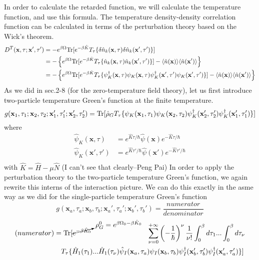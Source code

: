  In order to calculate the retarded function, we will calculate the temperature function, and use this formula.
 The temperature density-density correlation function can be calculated in terms of the perturbation theory based on the Wick's theorem.
\[
\begin{aligned}
D^T(\mathbf x,\tau;\mathbf x',\tau')&=-e^{\beta\Omega}\text{Tr}[e^{-\beta \hat K}T_\tau\{ \delta \hat n_k(\mathbf x ,\tau)\delta \hat n_k(\mathbf x' ,\tau') \}]\\
&=-\left\{e^{\beta\Omega}\text{Tr}[e^{-\beta \hat K}T_\tau\{ \hat n_k(\mathbf x ,\tau)\hat n_k(\mathbf x' ,\tau') \}] -\langle \hat n(\mathbf x)\rangle \langle \hat n (\mathbf x')\rangle \right\}\\
&=-\left\{e^{\beta\Omega}\text{Tr}[e^{-\beta \hat K}T_\tau\{ \psi_K^\dag(\mathbf x,\tau)\psi_K(\mathbf x,\tau) \psi_K^\dag(\mathbf x',\tau')\psi_K(\mathbf x',\tau') \}] -\langle \hat n(\mathbf x)\rangle \langle \hat n (\mathbf x')\rangle \right\}
\end{aligned}
\]
As we did in sec.2-8 (for the zero-temperature field theory), let us first introduce two-particle temperature Green's function at the finite temperature.
\begin{equation}
g(\mathbf x_1,\tau_1;\mathbf x_2,\tau_2;\mathbf x_1',\tau_1';\mathbf x_2',\tau_2')=\text{Tr} [\hat \rho_G T_\tau\{\psi_K(\mathbf x_1,\tau_1)\psi_K(\mathbf x_2,\tau_2)\psi_K^\dag(\mathbf x_2',\tau_2')\psi_K^\dag(\mathbf x_1',\tau_1')\}]
\end{equation}
where
\[
\begin{aligned}
\hat \psi_K(\mathbf x ,\tau)&=e^{\hat K\tau/\hbar}\hat \psi(\mathbf x)e^{-\hat K\tau/\hbar}\\
\hat \psi_K(\mathbf x' ,\tau')&=e^{\hat K\tau'/\hbar}\hat \psi(\mathbf x')e^{-\hat K\tau'/\hbar}\\
\end{aligned}
\]
with $\hat K=\hat H-\mu \hat N$ (I can't see that clearly--Peng Pai)
 In order to apply the perturbation theory to the two-particle temperature Green's function, we again rewrite this interns of the interaction picture.
 We can do this exactly in the asme way as we did for the single-particle temperature Green's function
\[
g(\mathbf x_a,\tau_a;\mathbf x_b,\tau_b;\mathbf x_a',\tau_a';\mathbf x_b',\tau_b')=\frac{numerator}{denominator}
\]
\[
\begin{aligned}
(numerator)&=\text{Tr} [ \cancelto{\rho^0_G=e^{\beta\Omega_0-\beta\hat K_0}}{e^{-\beta\hat K_0}}\qquad \qquad\qquad\qquad\sum_{\nu=0}^{+\infty}\left( -\frac{1}{\hbar}\right)^\nu \frac{1}{\nu!}\int_0^{\beta}d\tau_1 ... \int_0^{\beta}d\tau_\nu\\
 &\quad T_\tau\{ \hat H_1(\tau_1)...\hat H_1(\tau_\nu) \hat\psi_I(\mathbf x_a,\tau_a) \psi_I(\mathbf x_b,\tau_b) \psi_I^\dag(\mathbf x_b',\tau_b') \psi_I^\dag(\mathbf x_a',\tau_a') \}  ]
\end{aligned}
\]

